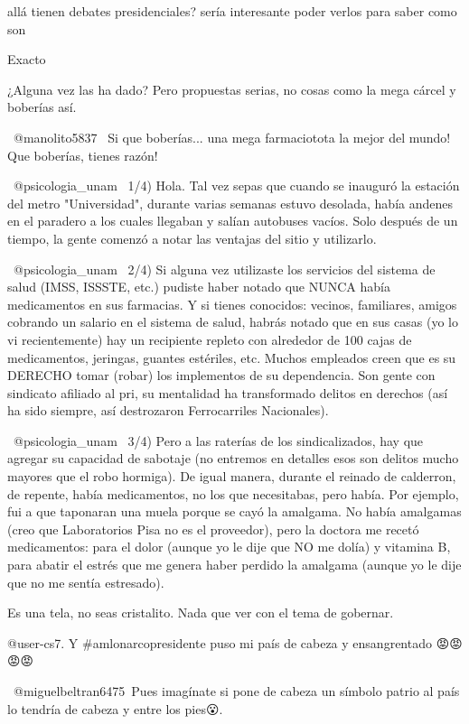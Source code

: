 allá tienen debates presidenciales? sería interesante poder verlos para saber como son

Exacto

¿Alguna vez las ha dado?  Pero propuestas serias, no cosas como la mega cárcel y boberías así.

 @manolito5837  Si que boberías... una mega farmaciotota la mejor del mundo! Que boberías, tienes razón!

 @psicologia_unam    1/4) Hola.    Tal vez sepas que cuando se inauguró la estación del metro "Universidad", durante varias semanas estuvo desolada, había andenes en el paradero a los cuales llegaban y salían autobuses vacíos.    Solo después de un tiempo, la gente comenzó a notar las ventajas del sitio y utilizarlo.

 @psicologia_unam  2/4) Si alguna vez utilizaste los servicios del sistema de salud (IMSS, ISSSTE, etc.) pudiste haber notado que NUNCA había medicamentos en sus farmacias.   Y si tienes conocidos: vecinos, familiares, amigos cobrando un salario en el sistema de salud, habrás notado que en sus casas (yo lo vi recientemente) hay un recipiente repleto con alrededor de 100 cajas de medicamentos, jeringas, guantes estériles, etc.   Muchos empleados creen que es su DERECHO tomar (robar) los implementos de su dependencia.   Son gente con sindicato afiliado al pri, su mentalidad ha transformado delitos en derechos (así ha sido siempre, así destrozaron Ferrocarriles Nacionales).

 @psicologia_unam   3/4) Pero a las raterías de los sindicalizados, hay que agregar su capacidad de sabotaje (no entremos en detalles  esos son delitos mucho mayores que el robo hormiga).   De igual manera, durante el reinado de calderron, de repente, había medicamentos, no los que necesitabas, pero había.   Por ejemplo, fui a que taponaran una muela porque se cayó la amalgama.   No había amalgamas (creo que Laboratorios Pisa no es el proveedor), pero la doctora me recetó medicamentos: para el dolor (aunque yo le dije que NO me dolía) y vitamina B, para abatir el estrés que me genera haber perdido la amalgama (aunque yo le dije que no me sentía estresado).

Es una tela, no seas cristalito. Nada que ver con el tema de gobernar.

@user-cs7.   Y #amlonarcopresidente puso mi país de cabeza y ensangrentado 😡😡😡😡

​​ @miguelbeltran6475 Pues imagínate si pone de cabeza un símbolo patrio  al país lo tendría de cabeza y entre los pies😮.

